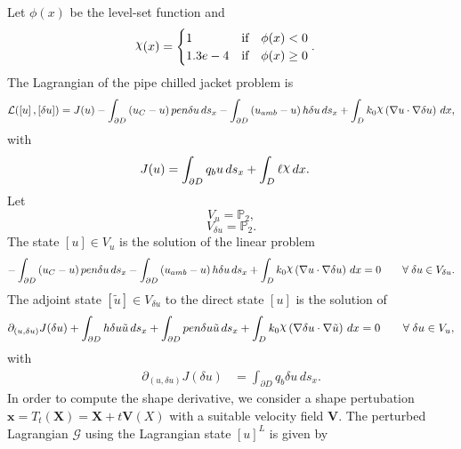 \documentclass[preview]{standalone}
\let\oldcdot\cdot
\let\cdot\oldcdot
\begin{document}
Let $\phi(x)$ be the level-set function and
 \begin{align*}\raisebox{\depth}{$\chi$}(x) &= \begin{cases} 1 & \mbox{if}\quad \phi(x) < 0 \\ 1.3e-4 & \mbox{if}\quad \phi(x)  \ge 0 \end{cases}.\end{align*}
The Lagrangian of the pipe chilled jacket problem is
\begin{dmath*}
\mathcal L(\left[ u\right],\left[ \delta u\right]) = J(u) -  \int_{\partial D} \left(u_{C} - u\right) pen \delta u \,ds_x -  \int_{\partial D} \left(u_{amb} - u\right) h \delta u \,ds_x +  \int_{D} k_{0} \raisebox{\depth}{$\chi$} \left(  \nabla u  \cdot  \nabla \delta u  \right) \,dx , 
\end{dmath*}
with 
\begin{align*}
J(u) &=  \int_{\partial D} q_{b} u \,ds_x +  \int_{D} \ell \raisebox{\depth}{$\chi$} \,dx.
 \end{align*}
Let
\begin{equation*}
V_{u} = \mathbb P_{2},\end{equation*}
\begin{equation*}
V_{\delta u} = \mathbb P_{2}.\end{equation*}
The state $\left[ u\right] \in  V_{u}$ is the solution of the linear problem
\begin{dmath*}
-  \int_{\partial D} \left(u_{C} - u\right) pen \delta u \,ds_x -  \int_{\partial D} \left(u_{amb} - u\right) h \delta u \,ds_x +  \int_{D} k_{0} \raisebox{\depth}{$\chi$} \left(  \nabla u  \cdot  \nabla \delta u  \right) \,dx = 0\qquad \forall\; {\delta u\in V_{\delta u}} . 
\end{dmath*}
The adjoint state $\left[ \tilde u\right] \in  V_{\delta u}$ to the direct state $\left[ u\right]$ is the solution of
\begin{dmath*}
\partial_{(u,\delta u)} J(\delta u) +  \int_{\partial D} h \delta u \tilde u \,ds_x +  \int_{\partial D} pen \delta u \tilde u \,ds_x +  \int_{D} k_{0} \raisebox{\depth}{$\chi$} \left(  \nabla \delta u  \cdot  \nabla \tilde u  \right) \,dx = 0\qquad \forall\; {\delta u\in V_{u}} , 
\end{dmath*}
with 
\begin{align*}
\partial_{(u,\delta u)} J(\delta u) &=  \int_{\partial D} q_{b} \delta u \,ds_x.
 \end{align*}
In order to compute the shape derivative, we consider a shape pertubation $\mathbf x = T_t(\mathbf X) = \mathbf X + t \mathbf  V(X)$ with a suitable velocity field $\mathbf V$. The perturbed Lagrangian $\mathcal G$ using the Lagrangian state $\left[ u\right]^{L}$ is given by
\end{document}
